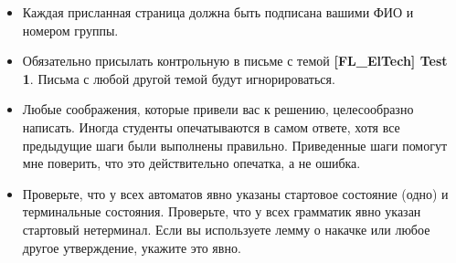 \documentclass[12pt]{article}
\begin{document}
\begin{itemize}
  \item Каждая присланная страница должна быть подписана вашими ФИО и номером группы.
  \item Обязательно присылать контрольную в письме с темой \textbf{[FL\_ElTech] Test 1}. Письма с любой другой темой будут игнорироваться.
  \item Любые соображения, которые привели вас к решению, целесообразно написать. Иногда студенты опечатываются в самом ответе, хотя все предыдущие шаги были выполнены правильно. Приведенные шаги помогут мне поверить, что это действительно опечатка, а не ошибка.
  \item Проверьте, что у всех автоматов явно указаны стартовое состояние (одно) и терминальные состояния. Проверьте, что у всех грамматик явно указан стартовый нетерминал. Если вы используете лемму о накачке или любое другое утверждение, укажите это явно.
\end{itemize}


\newpage
\end{document}
